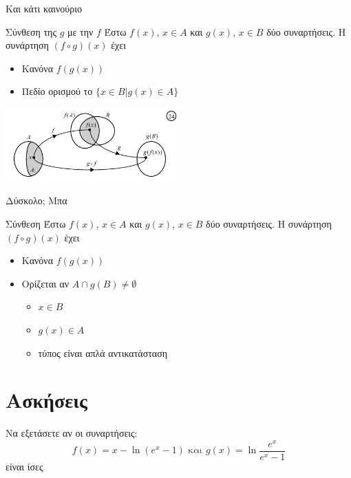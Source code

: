 \documentclass{presentation}
\begin{document}
\begin{frame}{Και κάτι καινούριο}
      \begin{block}{Σύνθεση της $g$ με την $f$}
            Έστω $f(x)$, $x\in Α$ και $g(x)$, $x\in Β$ δύο συναρτήσεις. Η συνάρτηση $(f\circ g)(x)$ έχει
            \begin{itemize}
                  \item Κανόνα $f(g(x))$
                  \item Πεδίο ορισμού το $\{x\in Β | g(x)\in Α \}$
            \end{itemize}
      \end{block}
      \centering
      \includegraphics[width=0.5\textwidth]{"images/1.2 Σύνθεση.png"}
\end{frame}

\begin{frame}{Δύσκολο; Μπα}
      \begin{block}{Σύνθεση}
            Έστω $f(x)$, $x\in Α$ και $g(x)$, $x\in Β$ δύο συναρτήσεις. Η συνάρτηση $(f\circ g)(x)$ έχει
            \begin{itemize}
                  \item Κανόνα $f(g(x))$
                  \item Ορίζεται αν $Α\cap g(Β)\ne \emptyset$
                        \begin{itemize}
                              \item<2-> $x\in Β$
                              \item<3-> $g(x)\in Α$
                              \item<4-> τύπος είναι απλά αντικατάσταση
                        \end{itemize}
            \end{itemize}
      \end{block}
\end{frame}

\section{Ασκήσεις}

\begin{askisi}
      Να εξετάσετε αν οι συναρτήσεις:
      $$f(x)=x-\ln (e^x-1) \text{ και } g(x)=\ln\frac{e^x}{e^x-1}$$
      είναι ίσες

\end{askisi}
\end{document}
